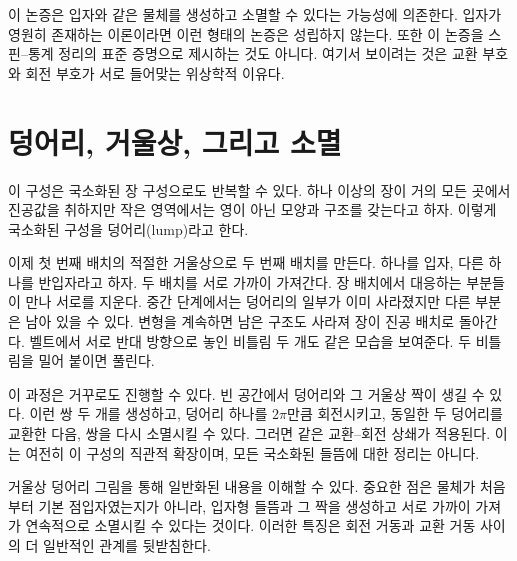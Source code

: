 이 논증은 입자와 같은 물체를 생성하고 소멸할 수 있다는 가능성에 의존한다. 입자가 영원히 존재하는 이론이라면 이런 형태의 논증은 성립하지 않는다. 또한 이 논증을 스핀--통계 정리의 표준 증명으로 제시하는 것도 아니다. 여기서 보이려는 것은 교환 부호와 회전 부호가 서로 들어맞는 위상학적 이유다.

\section{덩어리, 거울상, 그리고 소멸}

이 구성은 국소화된 장 구성으로도 반복할 수 있다. 하나 이상의 장이 거의 모든 곳에서 진공값을 취하지만 작은 영역에서는 영이 아닌 모양과 구조를 갖는다고 하자. 이렇게 국소화된 구성을 덩어리(lump)라고 한다.

이제 첫 번째 배치의 적절한 거울상으로 두 번째 배치를 만든다. 하나를 입자, 다른 하나를 반입자라고 하자. 두 배치를 서로 가까이 가져간다. 장 배치에서 대응하는 부분들이 만나 서로를 지운다. 중간 단계에서는 덩어리의 일부가 이미 사라졌지만 다른 부분은 남아 있을 수 있다. 변형을 계속하면 남은 구조도 사라져 장이 진공 배치로 돌아간다. 벨트에서 서로 반대 방향으로 놓인 비틀림 두 개도 같은 모습을 보여준다. 두 비틀림을 밀어 붙이면 풀린다.

이 과정은 거꾸로도 진행할 수 있다. 빈 공간에서 덩어리와 그 거울상 짝이 생길 수 있다. 이런 쌍 두 개를 생성하고, 덩어리 하나를 \(2\pi\)만큼 회전시키고, 동일한 두 덩어리를 교환한 다음, 쌍을 다시 소멸시킬 수 있다. 그러면 같은 교환--회전 상쇄가 적용된다. 이는 여전히 이 구성의 직관적 확장이며, 모든 국소화된 들뜸에 대한 정리는 아니다.

\begin{classroomqa}
\end{classroomqa}

거울상 덩어리 그림을 통해 일반화된 내용을 이해할 수 있다. 중요한 점은 물체가 처음부터 기본 점입자였는지가 아니라, 입자형 들뜸과 그 짝을 생성하고 서로 가까이 가져가 연속적으로 소멸시킬 수 있다는 것이다. 이러한 특징은 회전 거동과 교환 거동 사이의 더 일반적인 관계를 뒷받침한다.

\begin{classroomqa}
\end{classroomqa}

